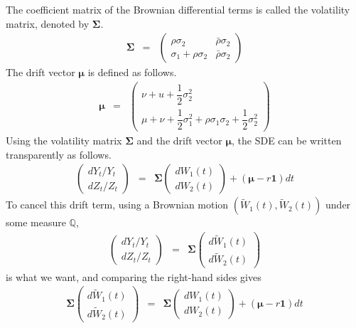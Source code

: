 \documentclass[uplatex,a4j,12pt,dvipdfmx]{jsarticle}
\begin{document}
The coefficient matrix of the Brownian differential terms is called the volatility matrix, denoted by ${\bm \Sigma}$.
%
%
\begin{eqnarray*}
	{\bm \Sigma}
	&=&
	\left(
	\begin{array}{cc}
			\rho \sigma_{2}              & \bar{\rho} \sigma_{2}
			\\
			\sigma_{1} + \rho \sigma_{2} & \bar{\rho} \sigma_{2}
		\end{array}
	\right)
\end{eqnarray*}
%
%
The drift vector ${\bm \mu}$ is defined as follows.
%
%
\begin{eqnarray*}
	{\bm \mu}
	&=&
	\left(
	\begin{array}{c}
			\nu + u + \dfrac{1}{2} \sigma_{2}^{2}
			\\
			\mu + \nu + \dfrac{1}{2} \sigma_{1}^{2} + \rho \sigma_{1} \sigma_{2} + \dfrac{1}{2} \sigma_{2}^{2}
		\end{array}
	\right)
\end{eqnarray*}
%
%
Using the volatility matrix ${\bm \Sigma}$ and the drift vector ${\bm \mu}$, the SDE can be written transparently as follows.
%
%
\begin{eqnarray*}
	\left(
	\begin{array}{c}
			d Y_{t} / Y_{t}
			\\
			d Z_{t} / Z_{t}
		\end{array}
	\right)
	&=&
	{\bm \Sigma}
	\left(
	\begin{array}{c}
			dW_{1}(t)
			\\
			dW_{2}(t)
		\end{array}
	\right)
	+
	( {\bm \mu} - r {\bm 1} ) dt
\end{eqnarray*}
%
%
To cancel this drift term, using a Brownian motion $(\tilde{W}_{1}(t),\tilde{W}_{2}(t))$ under some measure $\mathbb{Q}$,
%
%
\begin{eqnarray*}
	\left(
	\begin{array}{c}
			d Y_{t} / Y_{t}
			\\
			d Z_{t} / Z_{t}
		\end{array}
	\right)
	&=&
	{\bm \Sigma}
	\left(
	\begin{array}{c}
			d \tilde{W}_{1}(t)
			\\
			d \tilde{W}_{2}(t)
		\end{array}
	\right)
\end{eqnarray*}
%
%
is what we want, and comparing the right-hand sides gives
%
%
\begin{eqnarray*}
	{\bm \Sigma}
	\left(
	\begin{array}{c}
			d \tilde{W}_{1}(t)
			\\
			d \tilde{W}_{2}(t)
		\end{array}
	\right)
	&=&
	{\bm \Sigma}
	\left(
	\begin{array}{c}
			dW_{1}(t)
			\\
			dW_{2}(t)
		\end{array}
	\right)
	+
	( {\bm \mu} - r {\bm 1} ) dt
\end{eqnarray*}
\end{document}
